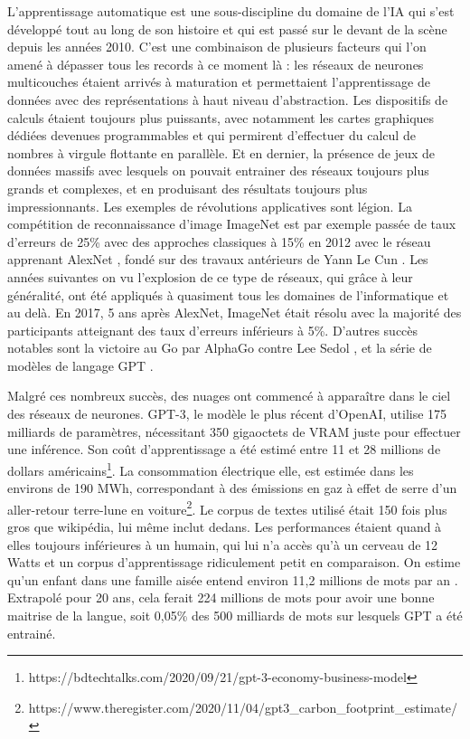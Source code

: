 	L'apprentissage automatique est une sous-discipline du domaine de l'IA qui s'est développé tout au long de son histoire et qui est passé sur le devant de la scène depuis les années 2010. C'est une combinaison de plusieurs facteurs qui l'on amené à dépasser tous les records à ce moment là : les réseaux de neurones multicouches étaient arrivés à maturation et permettaient l'apprentissage de données avec des représentations à haut niveau d'abstraction. Les dispositifs de calculs étaient toujours plus puissants, avec notamment les cartes graphiques dédiées devenues programmables et qui permirent d'effectuer du calcul de nombres à virgule flottante en parallèle. Et en dernier, la présence de jeux de données massifs avec lesquels on pouvait entrainer des réseaux toujours plus grands et complexes, et en produisant des résultats toujours plus impressionnants. Les exemples de révolutions applicatives sont légion. La compétition de reconnaissance d'image ImageNet est par exemple passée de taux d'erreurs de 25\% avec des approches classiques à 15\% en 2012 avec le réseau apprenant AlexNet \cite{krizhevsky2012imagenet}, fondé sur des travaux antérieurs de Yann Le Cun \cite{lecun1989backpropagation}. Les années suivantes on vu l'explosion de ce type de réseaux, qui grâce à leur généralité, ont été appliqués à quasiment tous les domaines de l'informatique et au delà. En 2017, 5 ans après AlexNet, ImageNet était résolu avec la majorité des participants atteignant des taux d'erreurs inférieurs à 5\%. D'autres succès notables sont la victoire au Go par AlphaGo contre Lee Sedol \cite{silver2016mastering}, et la série de modèles de langage GPT \cite{brown2020language}.

	Malgré ces nombreux succès, des nuages ont commencé à apparaître dans le ciel des réseaux de neurones. GPT-3, le modèle le plus récent d'OpenAI, utilise 175 milliards de paramètres, nécessitant 350 gigaoctets de VRAM juste pour effectuer une inférence. Son coût d'apprentissage a été estimé entre 11 et 28 millions de dollars américains\footnote{https://bdtechtalks.com/2020/09/21/gpt-3-economy-business-model}. La consommation électrique elle, est estimée dans les environs de 190 MWh, correspondant à des émissions en gaz à effet de serre d'un aller-retour terre-lune en voiture\footnote{https://www.theregister.com/2020/11/04/gpt3\_carbon\_footprint\_estimate/}. Le corpus de textes utilisé était 150 fois plus gros que wikipédia, lui même inclut dedans. Les performances étaient quand à elles toujours inférieures à un humain, qui lui n'a accès qu'à un cerveau de 12 Watts et un corpus d'apprentissage ridiculement petit en comparaison. On estime qu'un enfant dans une famille aisée entend environ 11,2 millions de mots par an \cite{hart2003early}. Extrapolé pour 20 ans, cela ferait 224 millions de mots pour avoir une bonne maitrise de la langue, soit 0,05\% des 500 milliards de mots sur lesquels GPT a été entrainé.


